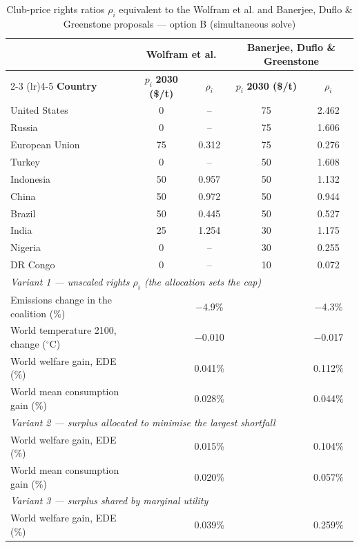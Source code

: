 \begin{table}[htbp]
\centering
\small
\caption{Club-price rights ratios $\rho_i$ equivalent to the Wolfram et al. and Banerjee, Duflo \& Greenstone proposals --- option B (simultaneous solve)}
\renewcommand{\arraystretch}{1.15}
\begin{tabular}{lcccc}
  \toprule
  & \multicolumn{2}{c}{\textbf{Wolfram et al.}} & \multicolumn{2}{c}{\textbf{Banerjee, Duflo \& Greenstone}} \\
  \cmidrule(lr){2-3} \cmidrule(lr){4-5}
  \textbf{Country} & $p_i$ \textbf{2030 (\$/t)} & $\rho_i$ & $p_i$ \textbf{2030 (\$/t)} & $\rho_i$ \\
  \midrule
  United States & 0 & -- & 75 & 2.462 \\
  Russia & 0 & -- & 75 & 1.606 \\
  European Union & 75 & 0.312 & 75 & 0.276 \\
  Turkey & 0 & -- & 50 & 1.608 \\
  Indonesia & 50 & 0.957 & 50 & 1.132 \\
  China & 50 & 0.972 & 50 & 0.944 \\
  Brazil & 50 & 0.445 & 50 & 0.527 \\
  India & 25 & 1.254 & 30 & 1.175 \\
  Nigeria & 0 & -- & 30 & 0.255 \\
  DR Congo & 0 & -- & 10 & 0.072 \\
  \midrule
  \multicolumn{5}{l}{\textit{Variant 1 --- unscaled rights $\rho_i$ (the allocation sets the cap)}} \\
  \quad Emissions change in the coalition (\%) &  & $-$4.9\% &  & $-$4.3\% \\
  \quad World temperature 2100, change ($^\circ$C) &  & $-$0.010 &  & $-$0.017 \\
  \quad World welfare gain, EDE (\%) &  & 0.041\% &  & 0.112\% \\
  \quad World mean consumption gain (\%) &  & 0.028\% &  & 0.044\% \\
  \midrule
  \multicolumn{5}{l}{\textit{Variant 2 --- surplus allocated to minimise the largest shortfall}} \\
  \quad World welfare gain, EDE (\%) &  & 0.015\% &  & 0.104\% \\
  \quad World mean consumption gain (\%) &  & 0.020\% &  & 0.057\% \\
  \midrule
  \multicolumn{5}{l}{\textit{Variant 3 --- surplus shared by marginal utility}} \\
  \quad World welfare gain, EDE (\%) &  & 0.039\% &  & 0.259\% \\

\end{tabular}
\end{table}
